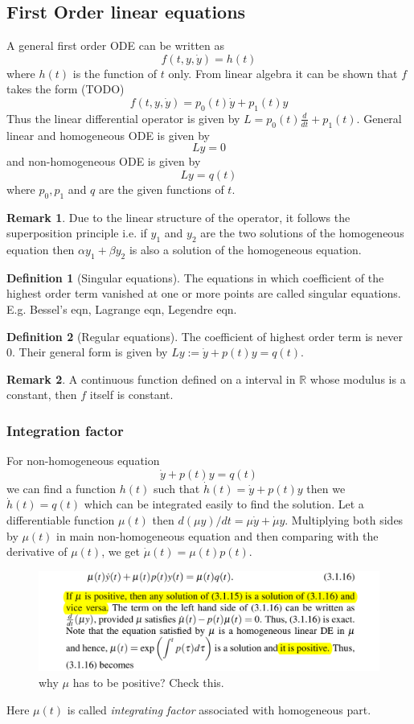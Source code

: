 \documentclass[12pt,reqno]{amsart}
\theoremstyle{plain}
\theoremstyle{definition}
\newtheorem{defn}{Definition}
\newtheorem{rem}{Remark}
\newcommand{\bb}[1]{\mathbb{#1}}
\begin{document}
\subsection{First Order linear equations}
A general first order ODE can be written as
$$ f(t, y, \dot{y}) = h(t)$$
where $h(t)$ is the function of $t$ only. From linear algebra it can be shown that $f$ takes the form (TODO)
$$ f(t,y,\dot{y}) = p_0(t)\dot{y} + p_1(t)y$$
Thus the linear differential operator is given by $ L = p_0(t)\frac{d}{dt} + p_1(t)$. General linear and homogeneous ODE is given by $$ Ly = 0$$ and non-homogeneous ODE is given by $$ Ly = q(t)$$ where $p_0, p_1$ and $q$ are the given functions of $t$.
\begin{rem}
    Due to the linear structure of the operator, it follows the superposition principle i.e. if $y_1$ and $y_2$ are the two solutions of the homogeneous equation then $\alpha y_1 + \beta y_2$ is also a solution of the homogeneous equation.
\end{rem}
\begin{defn}[Singular equations]
    The equations in which coefficient of the highest order term vanished at one or more points are called singular equations. E.g. Bessel's eqn, Lagrange eqn, Legendre eqn.
\end{defn}
\begin{defn}[Regular equations]
    The coefficient of highest order term is never $0$. Their general form is given by $Ly := \dot{y} + p(t)y = q(t)$.
\end{defn}
\begin{rem}
    A continuous function defined on a interval in $\bb{R}$ whose modulus is a constant, then $f$ itself is constant.  
\end{rem}
\subsubsection{\bf Integration factor} For non-homogeneous equation
$$ \dot{y} + p(t)y = q(t) $$
we can find a function $h(t)$ such that $ \dot{h}(t) = \dot{y} + p(t)y$ then we $\dot{h}(t) = q(t)$ which can be integrated easily to find the solution. Let a differentiable function $\mu(t)$ then $d(\mu y) /dt = \mu \dot{y} + \dot{\mu}y$. Multiplying both sides by $\mu(t)$ in main non-homogeneous equation and then comparing with the derivative of $\mu(t)$, we get $\dot{\mu}(t) = \mu(t)p(t)$. 
\begin{figure}[!ht]
    \centerline{\includegraphics[scale=.30]{../assets/integrating_fac.png}}
    \caption{why $\mu$ has to be positive? Check this.}
    \label{fig1}
\end{figure}
Here $\mu(t)$ is called {\it integrating factor} associated with homogeneous part.
\end{document}
